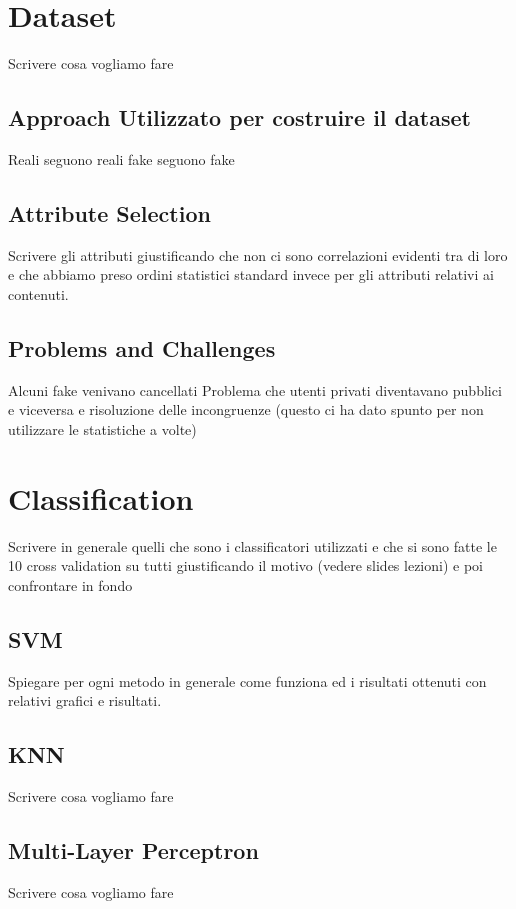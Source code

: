 \documentclass{article}
\begin{document}
\section{Dataset}
Scrivere cosa vogliamo fare

\subsection{Approach Utilizzato per costruire il dataset}
Reali seguono reali fake seguono fake

\subsection{Attribute Selection}
Scrivere gli attributi giustificando che non ci sono correlazioni evidenti tra di loro e che abbiamo preso ordini statistici standard invece per gli attributi relativi ai contenuti.


\subsection{Problems and Challenges}
Alcuni fake venivano cancellati
Problema che utenti privati diventavano pubblici e viceversa e risoluzione delle incongruenze (questo ci ha dato spunto per non utilizzare le statistiche a volte)


\section{Classification}
Scrivere in generale quelli che sono i classificatori utilizzati e che si sono fatte le 10 cross validation su tutti giustificando il motivo (vedere slides lezioni) e poi confrontare in fondo

\subsection{SVM}
Spiegare per ogni metodo in generale come funziona ed i risultati ottenuti con relativi grafici e risultati.
\subsection{KNN}
Scrivere cosa vogliamo fare

\subsection{Multi-Layer Perceptron}
Scrivere cosa vogliamo fare
\end{document}
